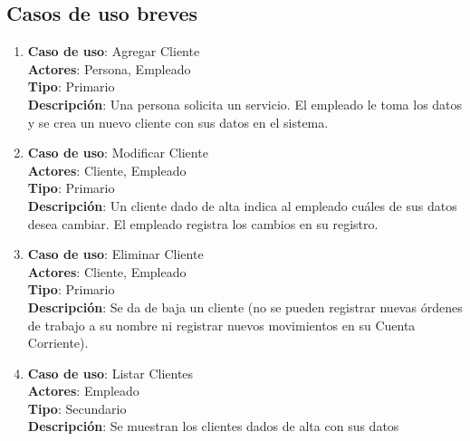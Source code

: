 \documentclass[12pt]{extarticle}
\begin{document}
\begin{spacing}{1.2}
        \clearpage

        \subsection{Casos de uso breves}


        \begin{enumerate}



            \subsubsection{Clientes}



            \item 	\textbf{Caso de uso}: Agregar Cliente\\
                    \textbf{Actores}: Persona, Empleado\\
                    \textbf{Tipo}: Primario\\
                    \textbf{Descripción}: Una persona solicita un servicio. El empleado le toma los datos y se crea un nuevo cliente con sus datos en el sistema.

            \item 	\textbf{Caso de uso}: Modificar Cliente\\
                    \textbf{Actores}: Cliente, Empleado\\
                    \textbf{Tipo}: Primario\\
                    \textbf{Descripción}: Un cliente dado de alta indica al empleado cuáles de sus datos desea cambiar. El empleado registra los cambios en su registro.

            \item 	\textbf{Caso de uso}: Eliminar Cliente\\
                    \textbf{Actores}: Cliente, Empleado\\
                    \textbf{Tipo}: Primario\\
                    \textbf{Descripción}: Se da de baja un cliente (no se pueden registrar nuevas órdenes de trabajo a su nombre ni registrar nuevos movimientos en su Cuenta Corriente).

            \item 	\textbf{Caso de uso}: Listar Clientes\\
                    \textbf{Actores}: Empleado\\
                    \textbf{Tipo}: Secundario\\
                    \textbf{Descripción}: Se muestran los clientes dados de alta con sus datos


\end{enumerate}
\end{spacing}
\end{document}
